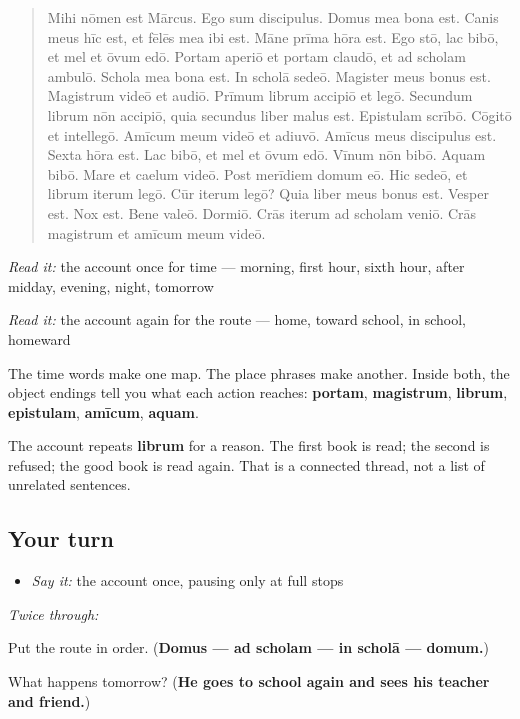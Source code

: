 \begin{tcolorbox}[breakable,skin=enhanced,colback=orange!6,colframe=orange!45!black,boxrule=0.5pt,arc=1mm,left=6pt,right=6pt,top=4pt,bottom=4pt,fonttitle=\bfseries,title={Read this}]
\begin{quote}
Mihi nōmen est Mārcus. Ego sum discipulus. Domus mea bona est. Canis meus hīc est, et fēlēs mea ibi est. Māne prīma hōra est. Ego stō, lac bibō, et mel et ōvum edō. Portam aperiō et portam claudō, et ad scholam ambulō. Schola mea bona est. In scholā sedeō. Magister meus bonus est. Magistrum videō et audiō. Prīmum librum accipiō et legō. Secundum librum nōn accipiō, quia secundus liber malus est. Epistulam scrībō. Cōgitō et intellegō. Amīcum meum videō et adiuvō. Amīcus meus discipulus est. Sexta hōra est. Lac bibō, et mel et ōvum edō. Vīnum nōn bibō. Aquam bibō. Mare et caelum videō. Post merīdiem domum eō. Hic sedeō, et librum iterum legō. Cūr iterum legō? Quia liber meus bonus est. Vesper est. Nox est. Bene valeō. Dormiō. Crās iterum ad scholam veniō. Crās magistrum et amīcum meum videō.
\end{quote}

\emph{Read it:} the account once for time — morning, first hour, sixth hour, after midday, evening, night, tomorrow

\emph{Read it:} the account again for the route — home, toward school, in school, homeward
\end{tcolorbox}

\begin{grammarlens}[title={Grammar Lens: the account has two maps}]
The time words make one map. The place phrases make another. Inside both, the object endings tell you what each action reaches: \textbf{portam}, \textbf{magistrum}, \textbf{librum}, \textbf{epistulam}, \textbf{amīcum}, \textbf{aquam}.

The account repeats \textbf{librum} for a reason. The first book is read; the second is refused; the good book is read again. That is a connected thread, not a list of unrelated sentences.
\end{grammarlens}

\subsection*{Your turn}
\begin{itemize}
\raggedright
  \item \emph{Say it:} the account once, pausing only at full stops
\end{itemize}

\emph{Twice through:}

\begin{tcolorbox}[breakable,colback=teal!4,colframe=teal!35!black,title={Before you move on}]
Put the route in order. (\textbf{Domus — ad scholam — in scholā — domum.})

What happens tomorrow? (\textbf{He goes to school again and sees his teacher and friend.})
\end{tcolorbox}
